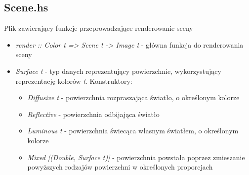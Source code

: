 \documentclass[11pt,a4paper]{article}
\begin{document}
\subsection{Scene.hs}
Plik zawierający funkcje przeprowadzające renderowanie sceny
\begin{itemize}
\item\textit{render :: Color t => Scene t -> Image t} - główna funkcja do renderowania sceny
\item\textit{Surface t} - typ danych reprezentujący powierzchnie, wykorzystujący reprezentację kolorów \textit{t}. Konstruktory:
\begin{itemize}
\item\textit{Diffusive t} - powierzchnia rozpraszająca światło, o określonym kolorze
\item\textit{Reflective} - powierzchnia odbijająca światło
\item\textit{Luminous t} - powierzchnia świecąca własnym światłem, o określonym kolorze
\item\textit{Mixed [(Double, Surface t)]} - powierzchnia powstała poprzez zmieszanie powyższych rodzajów powierzchni w określonych proporcjach
\end{itemize}
\end{itemize}
\end{document}

